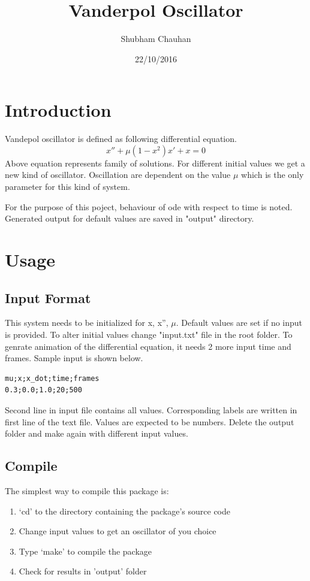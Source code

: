 \documentclass[a4paper]{article}
\title{Vanderpol Oscillator}
\author{Shubham Chauhan}
\date{22/10/2016}
\begin{document}
\maketitle

\section{Introduction}
Vandepol oscillator is defined as following differential equation.
\begin{equation}
 x'' + \mu(1 - x^2 )x' + x = 0
\end{equation}
Above equation represents family of solutions. For different initial values we get a new kind of oscillator. Oscillation are dependent on the value $\mu$ which is the only parameter for this kind of system.

For the purpose of this poject, behaviour of ode with respect to time is noted. Generated output for default values are saved in "output" directory.

\section{Usage}
\subsection{Input Format}
This system needs to be initialized for x, x'', $\mu$. Default values are set if no input is provided. To alter initial values change "input.txt" file in the root folder. To genrate animation of the differential equation, it needs 2 more input time and frames. Sample input is shown below.
\begin{verbatim}
mu;x;x_dot;time;frames
0.3;0.0;1.0;20;500
\end{verbatim}
Second line in input file contains all values. Corresponding labels are written in first line of the text file. Values are expected to be numbers. Delete the output folder and make again with different input values.

\subsection{Compile}
The simplest way to compile this package is:
\begin{enumerate}
\item `cd' to the directory containing the package's source code
\item Change input values to get an oscillator of you choice
\item Type `make' to compile the package
\item Check for results in 'output' folder
\end{enumerate}
\end{document}
